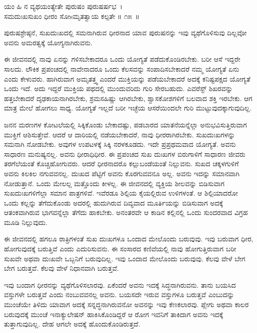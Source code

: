 \begin{shloka}
ಯಂ ಹಿ ನ ವ್ಯಥಯಂತ್ಯೇತೇ ಪುರುಷಂ ಪುರುಷರ್ಷಭ~।\\ಸಮದುಃಖಸುಖಂ ಧೀರಂ ಸೋsಮೃತತ್ವಾಯ ಕಲ್ಪತೇ \hfill॥ ೧೫~॥
\end{shloka}

\begin{artha}
ಪುರುಷಶ್ರೇಷ್ಠನೆ, ಸುಖದುಃಖದಲ್ಲಿ ಸಮನಾಗಿರುವ ಧೀರನಾದ ಯಾವ ಪುರುಷನನ್ನು ಇವು ವ್ಯಥೆಗೊಳಿಸುವು ದಿಲ್ಲವೋ ಅವನು ಅಮರತ್ವಕ್ಕೆ ಯೋಗ್ಯನಾಗಿರುವನು.
\end{artha}

ಈ ಜೀವನದಲ್ಲಿ ನಾವು ಏನನ್ನು ಗಳಿಸಬೇಕಾದರೂ ಒಂದು ಯೋಗ್ಯತೆ ಪಡೆದುಕೊಂಡಿರಬೇಕು. ಬರೀ ಆಸೆ ಇದ್ದರೇ ಸಾಲದು. ಲೌಕಿಕ ಪ್ರಪಂಚದಲ್ಲಿ ನಾವೇನಾದರೂ ಒಂದು ಕೆಲಸವನ್ನು ಸಂಪಾದಿಸಬೇಕಾದರೆ ನಮ್ಮ ಯೋಗ್ಯತೆ ಏನು ಎಂದು ಕೇಳುವರು. ಹಾಗಿರುವಾಗ ಅಮೃತತ್ತ್ವ ಎಂದರೆ ಮುಕ್ತಿಯನ್ನು ಪಡೆಯಬೇಕಾದರೆ ಅದಕ್ಕೆ ಕನಿಷ್ಟಪಕ್ಷದ ಯೋಗ್ಯತೆ ಒಂದು ಇದೆ. ಅದು ಇದ್ದರೆ ಮುಕ್ತಿಯ ಪಥದಲ್ಲಿ ಮುಂದುವರಿದು ಗುರಿ ಸೇರಬಹುದು. ಎವರೆಸ್ಟ್ ಶಿಖರವನ್ನು ಹತ್ತಬೇಕಾದರೆ ದೃಢಕಾಯನಾಗಿರಬೇಕು, ಶ್ರಮಸಹಿಷ್ಣು ಆಗಿರಬೇಕು, ಶ್ವಾಸಕೋಶಗಳಿಗೆ ಬಲವಾದ ಶಕ್ತಿ ಇರಬೇಕು. ಆಗ ಮಾತ್ರ ಮೇಲೆ ಹೋಗಲು ಸಾಧ್ಯ. ಯೋಗ್ಯತೆ ಇಲ್ಲದೆ ಬರೀ ಇಚ್ಛೆಯ ಆಸರೆಯಿಂದಲೇ ಗುರಿ ಮುಟ್ಟುವುದಕ್ಕಾಗುವುದಿಲ್ಲ.

ಜನನ ಮರಣಗಳ ಕೋಟಲೆಯಲ್ಲಿ ಸಿಕ್ಕಿಕೊಂಡು ಬೇಕಾದಷ್ಟು, ಪಡಬಾರದ ಯಾತನೆ\-ಯನ್ನೆಲ್ಲಾ ಅನುಭವಿಸುತ್ತಿರುವಾಗ ಮುಕ್ತಿಗೆ ಆಶಿಸುತ್ತೇವೆ. ಆದರೆ ಆ ದಾರಿಯಲ್ಲಿ ನಡೆಯಬೇಕಾದರೆ, ನಾವು ಧೀರರಾಗಿರಬೇಕು. ಸುಖದುಃಖಗಳನ್ನು ಸಮನಾಗಿ ನೋಡಬೇಕು. ಅವುಗಳ ಉಪಟಳಕ್ಕೆ ಸಿಕ್ಕಿ ನರಳಕೂಡದು. ಇದೇ ಪ್ರಪ್ರಥಮವಾದ ಯೋಗ್ಯತೆ. ಅವನು ಸಾಧಾರಣ ಮನುಷ್ಯನಲ್ಲ. ಅವನು ಧೀರಾಧಿಧೀರ. ಈ ಪ್ರಪಂಚದ ಸುಖ ದುಃಖಗಳ ಬಿರುಗಾಳಿಗೆ ಸಾಧಾರಣ ಜೀವರು ತರಗೆಲೆಯಂತೆ ಕೊಚ್ಚಿಹೋಗುವರು. ಆದರೆ ಧೀರನಾದರೊ ಕಲ್ಲುಬಂಡೆಯಂತೆ ನಿಲ್ಲುವನು. ಸುಖದ ಚಕ್ಕಳಗುಳಿಗೆ ಅವನು ಕಿಲಕಿಲ ನಗುವವನಲ್ಲ. ದುಃಖದ ಪೆಟ್ಟಿಗೆ ಅವನು ಕೊರಗುವವನೂ ಅಲ್ಲ. ಅವನು ಇದನ್ನು ಸಮಾನವಾಗಿ ನೋಡುತ್ತಾನೆ. ಒಂದು ಮೇಲಲ್ಲ ಮತ್ತೊಂದು ಕೀಳಲ್ಲ. ಈ ಜೀವನದಲ್ಲಿ ವ್ಯಕ್ತಿಯ ಶೀಲವನ್ನು ಬಿಡಿಸುವಾಗ ಸುಖದುಃಖಗಳಿಗೆಲ್ಲಾ ಸಮಾನ ಪಾತ್ರಗಳಿವೆ. ಇವೆರಡೂ ಶಿಲ್ಪಿಯ ಕೈಯಲ್ಲಿರುವ ಉಳಿಗಳಂತೆ. ಆ ಶಿಲ್ಪಿಯಾದರೋ ಒಂದು ಕಲ್ಲನ್ನು ತೆಗೆದುಕೊಂಡು ಅದರಲ್ಲಿ ಹುದುಗಿರುವ ದಿವ್ಯವಾದ ಮೂರ್ತಿಯನ್ನು ಬಿಡಿಸುವಾಗ ಅದಕ್ಕೆ ಆತಂಕವಾಗಿರುವ ಭಾಗವನ್ನೆಲ್ಲಾ ತೆಗೆದು ಹಾಕಬೇಕು. ಅನಂತರವೇ ಆ ಕಾಡಿನ ಕಲ್ಲಿನಲ್ಲಿ ಒಂದು ಸುಂದರವಾದ ವಿಗ್ರಹ ಮೂಡಿ ನಿಲ್ಲುವುದು.

ಈ ಜೀವನದಲ್ಲಿ ಹಗಲೂ ರಾತ್ರಿಗಳಂತೆ ಸುಖ ದುಃಖಗಳೂ ಒಂದಾದ ಮೇಲೊಂದು ಬರುವುವು. ಇವು ಬರುವಾಗ ಧೀರ, ಹೋಗುವುದಕ್ಕೆ ಬರುತ್ತಿವೆ ಎಂದು ಎದುರಿಸುವನು. ಈ ಸಂಸಾರದ ಕಣಿವೆಯಲ್ಲಿ ನಾವು ಹೋಗುತ್ತಿರುವಾಗ ಬರೀ ಸುಖವೇ ಅಥವಾ ದುಃಖವೇ ಒಬ್ಬನಿಗೆ ಬರುವುದಿಲ್ಲ. ಇವು ಒಂದಾದ ಮೇಲೊಂದು ಬರುವುವು. ಕೆಲವು ವೇಳೆ ಬೇಗ ಬೇಗ ಬರುತ್ತವೆ. ಕೆಲವು ವೇಳೆ ನಿಧಾನವಾಗಿ ಬರುತ್ತವೆ.

ಇವು ಬಂದಾಗ ಧೀರನನ್ನು ವ್ಯಥೆಗೊಳಿಸಲಾರವು. ಏಕೆಂದರೆ ಅವನು ಇದಕ್ಕೆ ಸಿದ್ಧನಾಗಿರುವನು. ತಾನು ಬಯಸಿದ ವಸ್ತುಗಳೇ ಬರುತ್ತವೆ ಎಂದು ನಂಬುವವನಲ್ಲ ಅವನು. ಬಯಸದೇ ಇರುವ ವಸ್ತುಗಳೂ ಬರುತ್ತವೆ ಎಂಬುದನ್ನು ಮುಂಚೆಯೇ ತಿಳಿದು ಯಾವಾಗ ಅದಕ್ಕೆ ಸನ್ನದ್ಧನಾಗಿರುವನೋ ಅವನನ್ನು ಇವು ಕೆಣಕಲಾರವು. ಪ್ಲೇಗು ಅಥವಾ ಕಾಲರ ಬರುವುದಕ್ಕೆ ಮುಂಚೆ ಇನಾಕ್ಯುಲೇಷನ್ ಹಾಕಿಸಿಕೊಂಡಿದ್ದರೆ ಆ ರೋಗ ಇವನಿಗೆ ತಾಕಿದಾಗ ಅವನು ಇದಕ್ಕೆ ತುತ್ತಾಗುವುದಿಲ್ಲ. ದೇಹ ಆಗಲೇ ಅದಕ್ಕೆ ಹೊಂದುಕೊಂಡಿರುತ್ತದೆ.

